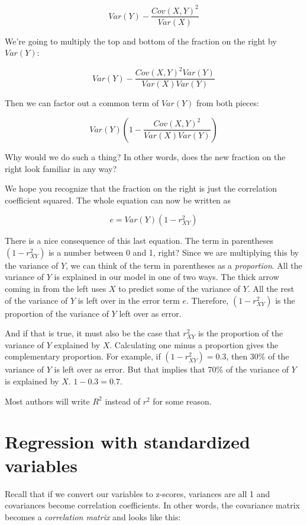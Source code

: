 \documentclass[
]{book}
\begin{document}
\[
Var(Y) - \frac{Cov(X, Y)^{2}}{Var(X)}
\]

We're going to multiply the top and bottom of the fraction on the right by \(Var(Y)\):

\[
Var(Y) - \frac{Cov(X, Y)^{2} Var(Y)}{Var(X) Var(Y)}
\]

Then we can factor out a common term of \(Var(Y)\) from both pieces:

\[
Var(Y) \left( 1 - \frac{Cov(X, Y)^{2}}{Var(X) Var(Y)} \right)
\]

Why would we do such a thing? In other words, does the new fraction on the right look familiar in any way?

We hope you recognize that the fraction on the right is just the correlation coefficient squared. The whole equation can now be written as

\[
e = Var(Y) \left( 1 - r_{XY}^2 \right)
\]

There is a nice consequence of this last equation. The term in parentheses \(\left( 1 - r_{XY}^2 \right)\) is a number between 0 and 1, right? Since we are multiplying this by the variance of \(Y\), we can think of the term in parentheses as a \emph{proportion}. All the variance of \(Y\) is explained in our model in one of two ways. The thick arrow coming in from the left uses \(X\) to predict some of the variance of \(Y\). All the rest of the variance of \(Y\) is left over in the error term \(e\). Therefore, \(\left( 1 - r_{XY}^2 \right)\) is the proportion of the variance of \(Y\) left over as error.

And if that is true, it must also be the case that \(r_{XY}^2\) is the proportion of the variance of \(Y\) explained by \(X\). Calculating one minus a proportion gives the complementary proportion. For example, if \(\left( 1 - r_{XY}^2 \right) = 0.3\), then 30\% of the variance of \(Y\) is left over as error. But that implies that 70\% of the variance of \(Y\) is explained by \(X\). \(1 - 0.3 = 0.7\).

Most authors will write \(R^{2}\) instead of \(r^{2}\) for some reason.

\hypertarget{simple-standardized}{%
\section{Regression with standardized variables}\label{simple-standardized}}

Recall that if we convert our variables to z-scores, variances are all 1 and covariances become correlation coefficients. In other words, the covariance matrix becomes a \emph{correlation matrix} and looks like this:
\end{document}
